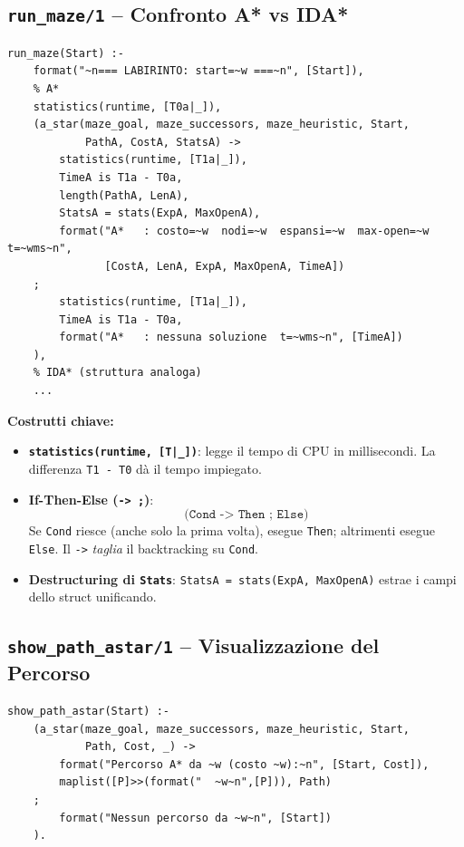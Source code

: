 \documentclass[12pt,a4paper]{article}
\begin{document}
\subsection{\texttt{run\_maze/1} -- Confronto A* vs IDA*}

\begin{lstlisting}
run_maze(Start) :-
    format("~n=== LABIRINTO: start=~w ===~n", [Start]),
    % A*
    statistics(runtime, [T0a|_]),
    (a_star(maze_goal, maze_successors, maze_heuristic, Start,
            PathA, CostA, StatsA) ->
        statistics(runtime, [T1a|_]),
        TimeA is T1a - T0a,
        length(PathA, LenA),
        StatsA = stats(ExpA, MaxOpenA),
        format("A*   : costo=~w  nodi=~w  espansi=~w  max-open=~w  t=~wms~n",
               [CostA, LenA, ExpA, MaxOpenA, TimeA])
    ;
        statistics(runtime, [T1a|_]),
        TimeA is T1a - T0a,
        format("A*   : nessuna soluzione  t=~wms~n", [TimeA])
    ),
    % IDA* (struttura analoga)
    ...
\end{lstlisting}

\textbf{Costrutti chiave:}
\begin{itemize}
  \item \textbf{\texttt{statistics(runtime, [T|\_])}}: legge il tempo di CPU in
        millisecondi. La differenza \texttt{T1 - T0} dà il tempo impiegato.
  \item \textbf{If-Then-Else (\texttt{-> ;})}:
        \[
          \texttt{(Cond -> Then ; Else)}
        \]
        Se \texttt{Cond} riesce (anche solo la prima volta), esegue \texttt{Then};
        altrimenti esegue \texttt{Else}. Il \texttt{->} \emph{taglia} il backtracking
        su \texttt{Cond}.
  \item \textbf{Destructuring di \texttt{Stats}}: \texttt{StatsA = stats(ExpA, MaxOpenA)}
        estrae i campi dello struct unificando.
\end{itemize}

\subsection{\texttt{show\_path\_astar/1} -- Visualizzazione del Percorso}

\begin{lstlisting}
show_path_astar(Start) :-
    (a_star(maze_goal, maze_successors, maze_heuristic, Start,
            Path, Cost, _) ->
        format("Percorso A* da ~w (costo ~w):~n", [Start, Cost]),
        maplist([P]>>(format("  ~w~n",[P])), Path)
    ;
        format("Nessun percorso da ~w~n", [Start])
    ).
\end{lstlisting}
\end{document}
